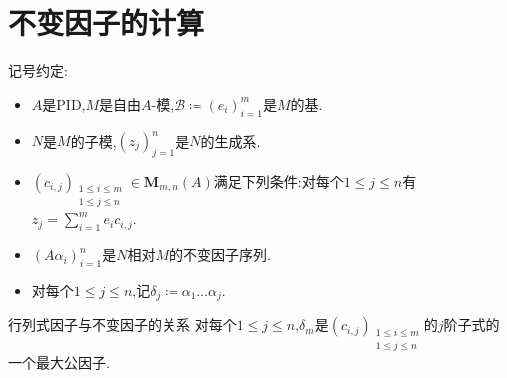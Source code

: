 \section{不变因子的计算}

记号约定:
\begin{itemize}
	\item $A$是PID,$M$是自由$A$-模,$\mathcal{B}\coloneq\left(e_{i}\right)_{i=1}^{m}$是$M$的基.
	\item $N$是$M$的子模,$\left(z_{j}\right)_{j=1}^{n}$是$N$的生成系.
	\item $\left(c_{i,j}\right)_{\substack{1\leq i\leq m\\ 1\leq j\leq n}}\in\mathbf{M}_{m,n}\left(A\right)$满足下列条件:对每个$1\leq j\leq n$有$z_{j}=\sum\limits_{i=1}^{m}e_{i}c_{i,j}$.
	\item $\left(A\alpha_{i}\right)_{i=1}^{n}$是$N$相对$M$的不变因子序列.
	\item 对每个$1\leq j\leq n$,记$\delta_{j}\coloneq\alpha_{1}\ldots\alpha_{j}$.
\end{itemize}

\begin{proposition}{行列式因子与不变因子的关系}{}
	对每个$1\leq j\leq n$,$\delta_{m}$是$\left(c_{i,j}\right)_{\substack{1\leq i\leq m\\ 1\leq j\leq n}}$的$j$阶子式的一个最大公因子.
\end{proposition}